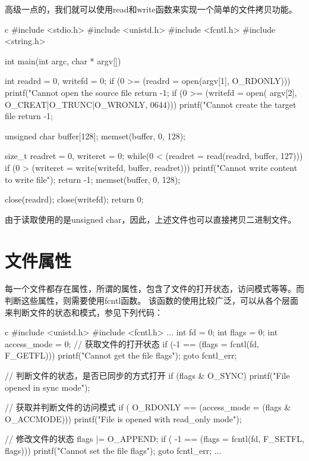 高级一点的，我们就可以使用read和write函数来实现一个简单的文件拷贝功能。
\begin{code-block}{c}
#include <stdio.h>
#include <unistd.h>
#include <fcntl.h>
#include <string.h>

int main(int argc, char * argv[])
{
        int readrd = 0, writefd = 0;
        if (0 >= (readrd = open(argv[1], O_RDONLY)))
        {
                printf("Cannot open the source file %
                return -1;
        }
        if (0 >= (writefd = open(
                argv[2], O_CREAT|O_TRUNC|O_WRONLY, 0644)))
        {
                printf("Cannot create the target file %
                return -1;
        }

        unsigned char buffer[128];
        memset(buffer, 0, 128);

        size_t readret = 0, writeret = 0;
        while(0 < (readret = read(readrd, buffer, 127)))
        {
                if (0 > (writeret = write(writefd, buffer, readret)))
                {
                        printf("Cannot write content to write file\n");
                        return -1;
                }
                memset(buffer, 0, 128);
        }

        close(readrd);
        close(writefd);
        return 0;
}
\end{code-block}

由于读取使用的是unsigned char，因此，上述文件也可以直接拷贝二进制文件。
\section{文件属性}
每一个文件都存在属性，所谓的属性，包含了文件的打开状态，访问模式等等。而判断这些属性，则需要使用fcntl函数。
该函数的使用比较广泛，可以从各个层面来判断文件的状态和模式，参见下列代码：
\begin{code-block}{c}
#include <unistd.h>
#include <fcntl.h>
...
        int fd = 0;
        int flags = 0;
        int access_mode = 0;
        // 获取文件的打开状态
        if (-1 == (flags = fcntl(fd, F_GETFL))) {
                printf("Cannot get the file flags\n");
                goto fcntl_err;
        }

        // 判断文件的状态，是否已同步的方式打开
        if (flags & O_SYNC) {
                printf("File opened in sync mode\n");
        }

        // 获取并判断文件的访问模式
        if ( O_RDONLY == (access_mode = (flags & O_ACCMODE))) {
                printf("File is opened with read_only mode\n");
        }

        // 修改文件的状态
        flags |= O_APPEND;
        if ( -1 == (flags = fcntl(fd, F_SETFL, flags))) {
                printf("Cannot set the file flags\n");
                goto fcntl_err;
        }
...
\end{code-block}

